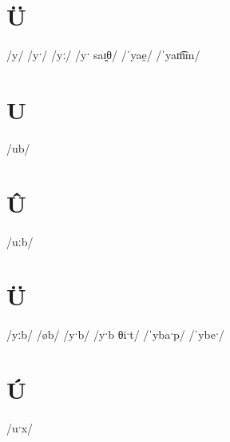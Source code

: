 \documentclass[10pt,a4paper,twoside]{book}
\begin{document}
\section*{Ü}

\begin{multicols}{3}
 {/y/} {}
 {/yˑ/} {}
 {/yː/} {}
 {/yˑ saɪ̯θ/} {}
 {/ˈyae̯/} {}
 {/ˈyam͡m/} {}
\end{multicols}

\section*{U}

\begin{multicols}{3}
 {/ub/} {}
\end{multicols}

\section*{Û}

\begin{multicols}{3}
 {/uːb/} {}
\end{multicols}

\section*{Ü}

\begin{multicols}{3}
 {/yːb/} {}
 {/øb/} {}
 {/yˑb/} {}
 {/yˑb θiˑt/} {}
 {/ˈybaˑp/} {}
 {/ˈybeˑ/} {}
\end{multicols}

\section*{Ú}

\begin{multicols}{3}
 {/uˑx/} {}
\end{multicols}
\end{document}
